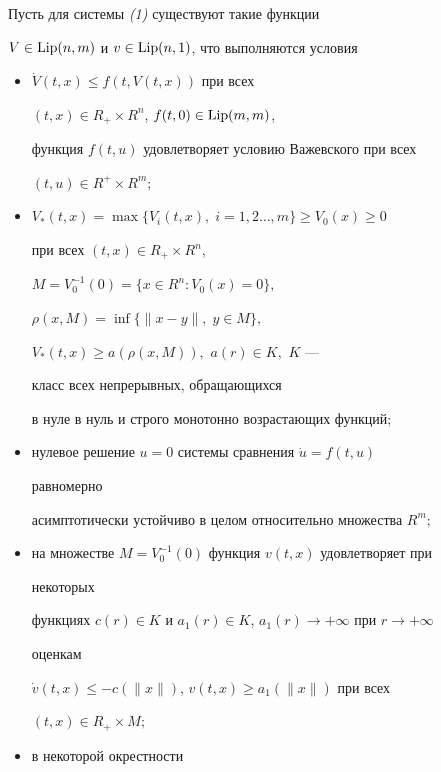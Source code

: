 \begin{thm} Пусть для системы {\em (1)} существуют такие функции 


$V\in\operatorname{Lip}(n,m)$ и $v\in\operatorname{Lip}(n,1)$, что выполняются условия 


\begin{itemize} 


\item[1.] $\Dot V(t,x)\le f(t,V(t,x))$ при всех 


$(t,x)\in R_+\times R^n$, $f(t,0)\in\operatorname{Lip}(m,m)$, 


функция $f(t,u)$ удовлетворяет условию Важевского при всех 


$(t,u)\in R^+\times R^m;$ 


 


\item[2.] $V_*(t,x)=\max\{V_i(t,x),\;i=1,2\dotsc,m\}\ge V_0(x)\ge 0$ 


при всех $(t,x)\in R_+\times R^n,$ 


$M=V_0^{-1}(0)=\{x\in R^n:V_0(x)=0\},$ 


$\rho(x,M)=\inf\{\|x-y\|,\;y\in M\},$ 


$V_*(t,x)\ge a(\rho(x,M)),$ $a(r)\in K,$ $K$ --- 


класс всех непрерывных, обращающихся 


в нуле в нуль и строго монотонно возрастающих функций; 


 


\item[3.] нулевое решение $u=0$ системы сравнения $\Dot u=f(t,u)$ 


равномерно 


асимптотически устойчиво в целом относительно множества $R^m;$ 


 


\item[4.] на множестве $M=V_0^{-1}(0)$ функция $v(t,x)$ удовлетворяет при 


некоторых 


функциях $c(r)\in K$ и $a_1(r)\in K$, $a_1(r)\to+\infty$ при $r\to+\infty$ 


оценкам 


$\Dot v(t,x)\le -c(\|x\|)$, $v(t,x)\ge a_1(\|x\|)$ при всех 


$(t,x)\in R_+\times M;$ 


 


\item [5.] в некоторой окрестности 



\end{itemize}
\end{thm}

